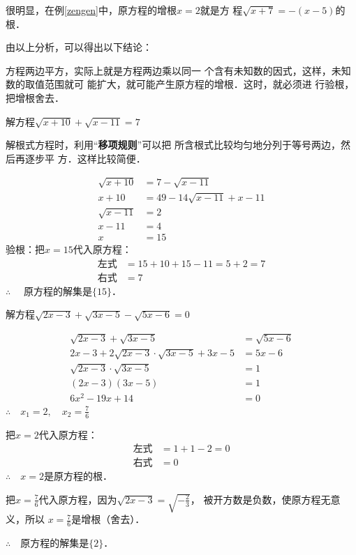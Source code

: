 很明显，在例\ref{zengen}中，原方程的增根$x=2$就是方
程$\sqrt{x+7}=-(x-5)$的根．

由以上分析，可以得出以下结论：

\begin{blk}{}
    方程两边平方，实际上就是方程两边乘以同一
个含有未知数的因式，这样，未知数的取值范围就可
能扩大，就可能产生原方程的增根．这时，就必须进
行验根，把增根舍去．
\end{blk}



\begin{example}
    解方程$\sqrt{x+10}+\sqrt{x-11}=7$
\end{example}

\begin{analyze}
    解根式方程时，利用“\textbf{移项规则}”可以把
所含根式比较均匀地分列于等号两边，然后再逐步平
方．这样比较简便．
\end{analyze}


\begin{solution}
\begin{align*}
    \sqrt{x+10}&=7-\sqrt{x-11}\tag{移项}\\
x+10&=49-14\sqrt{x-11}+x-11  \tag{两边平方}\\
\sqrt{x-11}&=2\\
x-11&=4 \tag{两边平方}\\
x&=15
\end{align*}
验根：把$x=15$代入原方程：
\[\begin{split}
    \text{左式}&=15+10+15-11=5+2=7\\
    \text{右式}&=7
\end{split}\]
$\therefore\quad $
原方程的解集是$\{15\}$．
\end{solution}

\begin{example}\label{zengen2}
    解方程$\sqrt{2x-3}+\sqrt{3x-5}-\sqrt{5x-6}=0$
\end{example}

\begin{solution}
\begin{align*}
    \sqrt{2x-3}+\sqrt{3x-5}&=\sqrt{5x-6}  \tag{移项}\\
2x-3+2\sqrt{2x-3}\cdot \sqrt{3x-5}+3x-5&=5x-6  \tag{两边平方}\\
\sqrt{2x-3}\cdot \sqrt{3x-5}&=1\\
(2x-3)(3x-5)&=1   \tag{两边平方}\\
6x^2-19x+14&=0
\end{align*}
$\therefore\quad x_1=2,\quad x_2=\frac{7}{6}$

把$x=2$代入原方程：
\[\begin{split}
    \text{左式}&=1+1-2=0\\
    \text{右式}&=0
\end{split}\]
$\therefore\quad x=2$是原方程的根．

把$x=\frac{7}{6}$代入原方程，因为$\sqrt{2x-3}=\sqrt{-\frac{2}{3}}$，
被开方数是负数，使原方程无意义，所以
$x=\frac{7}{6}$是增根（舍去）．

$\therefore\quad $原方程的解集是$\{2\}$．
\end{solution}

